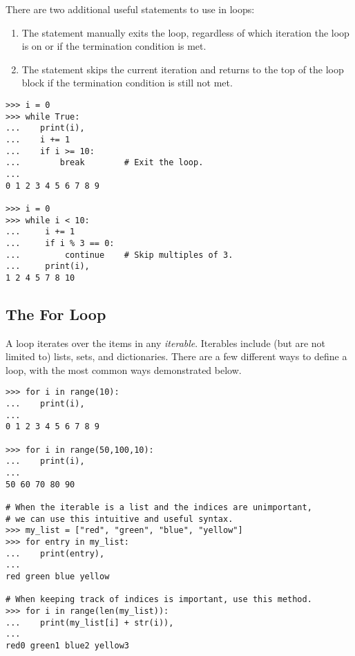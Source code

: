 \begin{comment}
\begin{info} %
In Python 2.7, executing \li{print(x)} prints out the string representation for the object \li{x} and a newline character (\li{\\n}).
Subsequent \li{print} statements will therefore display the object on a separate line.

In the above example, the comma in the line \li{print(i),} strips off the default endline character.
Subsequent calls then display the object on same line as previous call.
Try running this example with and without the comma.
\end{info}
\end{comment}

There are two additional useful statements to use in loops:
\begin{enumerate}
\item The  statement manually exits the loop, regardless of which iteration the loop is on or if the termination condition is met.
\item The  statement skips the current iteration and returns to the top of the loop block if the termination condition is still not met.
\end{enumerate}

\begin{lstlisting}
>>> i = 0
>>> while True:
...    print(i),
...    i += 1
...    if i >= 10:
...        break        # Exit the loop.
...
0 1 2 3 4 5 6 7 8 9

>>> i = 0
>>> while i < 10:
...     i += 1
...     if i % 3 == 0:
...         continue    # Skip multiples of 3.
...     print(i),
1 2 4 5 7 8 10

\end{lstlisting}

\subsection*{The For Loop}
A  loop iterates over the items in any \emph{iterable}.
Iterables include (but are not limited to) lists, sets, and dictionaries.
There are a few different ways to define a  loop, with the most common ways demonstrated below.

\begin{lstlisting}
>>> for i in range(10):
...    print(i),
...     
0 1 2 3 4 5 6 7 8 9

>>> for i in range(50,100,10):
...    print(i),
...
50 60 70 80 90

# When the iterable is a list and the indices are unimportant,
# we can use this intuitive and useful syntax.
>>> my_list = ["red", "green", "blue", "yellow"]
>>> for entry in my_list:
...    print(entry),
...
red green blue yellow

# When keeping track of indices is important, use this method.
>>> for i in range(len(my_list)):
...    print(my_list[i] + str(i)),
...
red0 green1 blue2 yellow3
\end{lstlisting}

